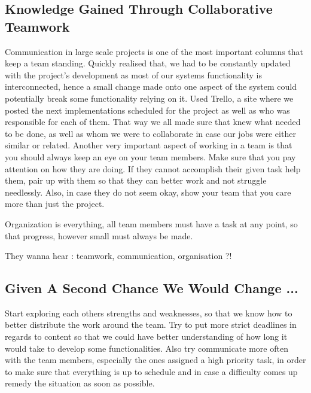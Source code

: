 \documentclass[11pt,a4paper]{article}
\begin{document}
        \subsection{Knowledge Gained Through Collaborative Teamwork}
        Communication in large scale projects is one of the most important columns that keep a team standing. Quickly realised that, we had to be constantly updated with the project's development as most of our systems functionality is interconnected, hence a small change made onto one aspect of the system could potentially break some functionality relying on it. 
        Used Trello, a site where we posted the next implementations scheduled for the project as well as who was responsible for each of them. That way we all made sure that knew what needed to be done, as well as whom we were to collaborate in case our jobs were either similar or related.
        Another very important aspect of working in a team is that you should always keep an eye on your team members. Make sure that you pay attention on how they are doing. If they cannot accomplish their given task help them, pair up with them so that they can better work and not struggle needlessly. Also, in case they do not seem okay, show your team that you care more than just the project.
         
        Organization is everything, all team members must have a task at any point, so that progress, however small must always be made. 

        They wanna hear : teamwork, communication, organisation ?!


        \subsection{Given A Second Chance We Would Change ...}
        Start exploring each others strengths and weaknesses, so that we know how to better distribute the work around the team. Try to put more strict deadlines in regards to content so that we could have better understanding of how long it would take to develop some functionalities. 
        Also try communicate more often with the team members, especially the ones assigned a high priority task, in order to make sure that everything is up to schedule and in case a difficulty comes up remedy the situation as soon as possible.
\end{document}

